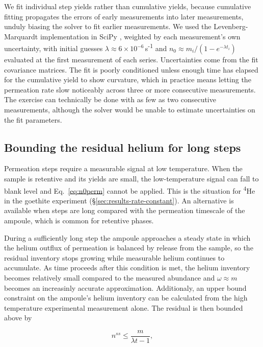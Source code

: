 We fit individual step yields rather than cumulative yields, because cumulative fitting propagates the errors of early measurements into later measurements, unduly biasing the solver to fit earlier measurements. We used the Levenberg-Marquardt implementation in SciPy \citep{virtanen2020}, weighted by each measurement's own uncertainty, with initial guesses $\lambda \approx 6\times10^{-6}$\,s\textsuperscript{-1} and $n_{0} \approx m_{i}/(1-e^{-\lambda t_{i}})$ evaluated at the first measurement of each series. Uncertainties come from the fit covariance matrices. The fit is poorly conditioned unless enough time has elapsed for the cumulative yield to show curvature, which in practice means letting the permeation rate slow noticeably across three or more consecutive measurements. The exercise can technically be done with as few as two consecutive measurements, although the solver would be unable to estimate uncertainties on the fit parameters. 

\subsection{Bounding the residual helium for long steps}\label{sec:bounding}

Permeation steps require a measurable signal at low temperature. When the sample is retentive and its yields are small, the low-temperature signal can fall to blank level and Eq.~\eqref{eq:n0perm} cannot be applied. This is the situation for \textsuperscript{4}He in the goethite experiment (\S\ref{sec:results-rate-constant}). An alternative is available when steps are long compared with the permeation timescale of the ampoule, which is common for retentive phases.

During a sufficiently long step the ampoule approaches a steady state in which the helium outflux of permeation is balanced by release from the sample, so the residual inventory stops growing while measurable helium continues to accumulate. As time proceeds after this condition is met, the helium inventory becomes relatively small compared to the measured abundance and $\omega \approx m$ becomes an increasinly accurate approximation. Additionaly, an upper bound constraint on the ampoule's helium inventory can be calculated from the high temperature experimental measurement alone. The residual is then bounded above by

\begin{equation}
\label{eq:steadystate}
n^{ss} \leq \frac{m}{\lambda t - 1} ,
\end{equation}


